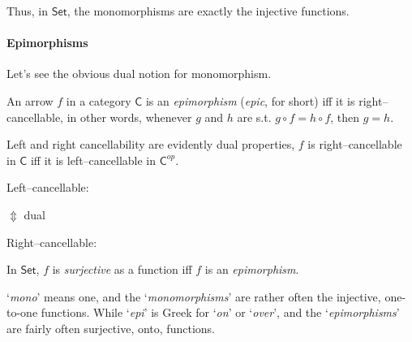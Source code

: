 Thus, 
in $\mathsf{Set}$, 
the monomorphisms are exactly the injective functions.




\paragraph{Epimorphisms}

Let's see the obvious dual notion for monomorphism.

\begin{df}[Epimorphisms]
	An arrow $f$ in a category $\mathsf{C}$ is an \textit{epimorphism} (\textit{epic}, for short) iff it is {\color{teal} right--cancellable}, 
	in other words, 
	whenever $g$ and $h$ are s.t. $g \circ f=h \circ f$, 
	then $g = h$.
\end{df}


Left and right cancellability are evidently dual properties, 
$f$ is right--cancellable in $\mathsf{C}$ iff it is left--cancellable in $\mathsf{C}^{op}$. 


\begin{center}
	Left--cancellable:
	
	\vspace{1em}
	\hspace{6em}$\Updownarrow$ dual
	\vspace{1em}

	Right--cancellable:
	
\end{center}



\begin{prop}
	In $\mathsf{Set}$, 
	$f$ is \textit{surjective} as a function iff $f$ is an \textit{epimorphism}.
\end{prop}


\vspace{2em}

\begin{tcolorbox}[arc=2mm,title={monic v.s epic}] %

	`\textit{mono}' means one, 
	and the `\textit{monomorphisms}' are rather often the injective, one-to-one functions. 
	While `\textit{epi}' is Greek for `\textit{on}' or `\textit{over}', 
	and the `\textit{epimorphisms}' are  fairly often surjective, onto, functions. 

\end{tcolorbox}


